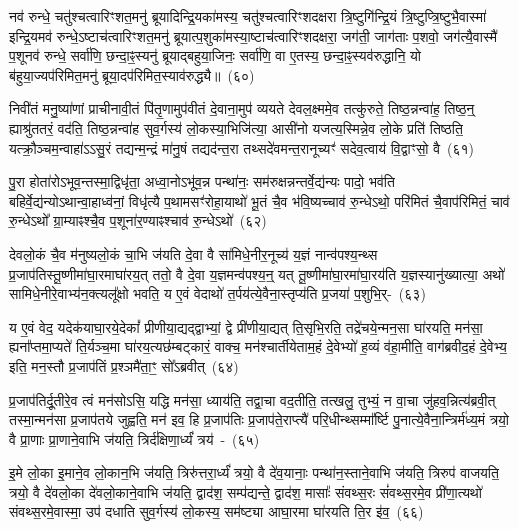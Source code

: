 नव॑ रुन्धे॒ चतु॑श्चत्वारिꣳशत॒मनु॑ ब्रूयादिन्द्रि॒यका॑मस्य॒ चतु॑श्चत्वारिꣳशदक्षरा त्रि॒ष्टुगि॑न्द्रि॒यं त्रि॒ष्टुप्त्रि॒ष्टुभै॒वास्मा॑ इन्द्रि॒यमव॑ रुन्धे॒\-ऽष्टाच॑त्वारिꣳशत॒मनु॑ ब्रूयात्प॒शुका॑मस्या॒ष्टाच॑त्वारिꣳशदक्षरा॒ जग॑ती॒ जाग॑ताः प॒शवो॒ जग॑त्यै॒वास्मै॑ प॒शूनव॑ रुन्धे॒ सर्वा॑णि॒ छन्दा॒ꣴ॒स्यनु॑ ब्रूयाद्बहुया॒जिनः॒ सर्वा॑णि॒ वा ए॒तस्य॒ छन्दा॒ꣴ॒स्यव॑रुद्धानि॒ यो ब॑हुया॒ज्यप॑रिमित॒मनु॑ ब्रूया॒दप॑रिमित॒स्याव॑रुद्ध्यै॥~(६०)

{\anuvakamend[{का॒मये॑त॒ प्रति॑ष्ठित्यै प॒शून्थ्स॒प्तच॑त्वारिꣳशच्च}]}%

निवी॑तं मनु॒ष्या॑णां प्राचीनावी॒तं पि॑तृ॒णामुप॑वीतं दे॒वाना॒मुप॑ व्ययते देवल॒क्ष्ममे॒व तत्कु॑रुते॒ तिष्ठ॒न्नन्वा॑ह॒ तिष्ठ॒न्॒ ह्याश्रु॑ततरं॒ वद॑ति॒ तिष्ठ॒न्नन्वा॑ह सुव॒र्गस्य॑ लो॒कस्या॒भिजि॑त्या॒ आसी॑नो यजत्य॒स्मिन्ने॒व लो॒के प्रति॑ तिष्ठति॒ यत्क्रौ॒ञ्चम॒न्वाहा॑ऽऽसु॒रं तद्यन्म॒न्द्रं मा॑नु॒षं तद्यद॑न्त॒रा तथ्सदे॑वमन्त॒रानूच्यꣳ॑ सदेव॒त्वाय॑ वि॒द्वाꣳसो॒ वै~(६१)

पु॒रा होता॑रो\-ऽभूव॒न्तस्मा॒द्विधृ॑ता॒ अध्वा॒नो\-ऽभू॑व॒न्न पन्था॑नः॒ सम॑रुक्षन्नन्तर्वे॒द्य॑न्यः पादो॒ भव॑ति बहिर्वे॒द्य॑न्यो\-ऽथान्वा॒हाध्व॑नां॒ विधृ॑त्यै प॒थामसꣳ॑रोहा॒याथो॑ भू॒तं चै॒व भ॑वि॒ष्यच्चाव॑ रु॒न्धे\-ऽथो॒ परि॑मितं चै॒वाप॑रिमितं॒ चाव॑ रु॒न्धे\-ऽथो᳚ ग्रा॒म्याꣴश्चै॒व प॒शूना॑र॒ण्याꣴश्चाव॑ रु॒न्धे\-ऽथो॑~(६२)

देवलो॒कं चै॒व म॑नुष्यलो॒कं चा॒भि ज॑यति दे॒वा वै सा॑मिधे॒नीर॒नूच्य॑ य॒ज्ञं नान्व॑पश्य॒न्थ्स प्र॒जा\-प॑तिस्तू॒ष्णीमा॑घा॒र\-माघा॑र\-य॒त् ततो॒ वै दे॒वा य॒ज्ञमन्व॑पश्य॒न्॒ यत् तू॒ष्णीमा॑\-घा॒रमा॑\-घा॒रय॑ति य॒ज्ञस्यानु॑\-ख्यात्या॒ अथो॑ सामिधे॒नीरे॒वाभ्य॑न॒क्त्यलू᳚क्षो भवति॒ य ए॒वं वेदाथो॑ त॒र्पय॑त्ये॒वैना॒स्तृप्य॑ति प्र॒जया॑ प॒शुभि॒र्-~(६३)

य ए॒वं वेद॒ यदेक॑याघा॒रये॒देकां᳚ प्रीणीया॒द्यद्द्वाभ्यां॒ द्वे प्री॑णीया॒द्यत् ति॒सृभि॒रति॒ तद्रे॑चये॒न्मन॒सा घा॑रयति॒ मन॑सा॒ ह्यना᳚प्तमा॒प्यते॑ ति॒र्यञ्च॒मा घा॑रय॒त्यछ॑म्बट्कारं॒ वाक्च॒ मन॑श्चार्तीयेताम॒हं दे॒वेभ्यो॑ ह॒व्यं व॑हा॒मीति॒ वाग॑ब्रवीद॒हं दे॒वेभ्य॒ इति॒ मन॒स्तौ प्र॒जा\-प॑तिं प्र॒श्ञमै॑ता॒ꣳ॒ सो᳚\-ऽब्रवीत्~(६४)

प्र॒जा\-प॑तिर्दू॒तीरे॒व त्वं मन॑सो\-ऽसि॒ यद्धि मन॑सा॒ ध्याय॑ति॒ तद्वा॒चा वद॒तीति॒ तत्खलु॒ तुभ्यं॒ न वा॒चा जु॑हव॒न्नित्य॑ब्रवी॒त् तस्मा॒न्मन॑सा प्र॒जा\-प॑तये जुह्वति॒ मन॑ इव॒ हि प्र॒जा\-प॑तिः प्र॒जा\-प॑ते॒राप्त्यै॑ परि॒धीन्थ्सम्मा᳚र्ष्टि पु॒नात्ये॒वैना॒न्त्रिर्म॑ध्य॒मं त्रयो॒ वै प्रा॒णाः प्रा॒णाने॒वाभि ज॑यति॒ त्रिर्द॑क्षिणा॒र्ध्यं॑ त्रय॑~-~(६५)

इ॒मे लो॒का इ॒माने॒व लो॒कान॒भि ज॑यति॒ त्रिरु॑त्तरा॒र्ध्यं॑ त्रयो॒ वै दे॑व॒यानाः॒ पन्था॑न॒स्ताने॒वाभि ज॑यति॒ त्रिरुप॑ वाजयति॒ त्रयो॒ वै दे॑वलो॒का दे॑वलो॒काने॒वाभि ज॑यति॒ द्वाद॑श॒ सम्प॑द्यन्ते॒ द्वाद॑श॒ मासाः᳚ संवथ्स॒रः सं॑वथ्स॒रमे॒व प्री॑णा॒त्यथो॑ संवथ्स॒रमे॒वास्मा॒ उप॑ दधाति सुव॒र्गस्य॑ लो॒कस्य॒ सम॑ष्ट्या आघा॒रमा घा॑रयति ति॒र इ॑व॒~(६६)

